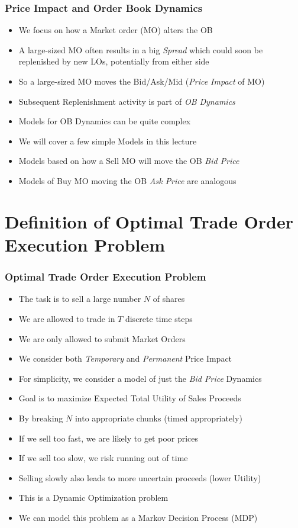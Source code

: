 \documentclass[handout]{beamer}
\begin{document}
\begin{frame}
\frametitle{Price Impact and Order Book Dynamics}
\pause
\begin{itemize}[<+->]
\item We focus on how a Market order (MO) alters the OB
\item A large-sized MO often results in a big {\em Spread} which could soon be replenished by new LOs, potentially from either side
\item So a large-sized MO moves the Bid/Ask/Mid ({\em Price Impact} of MO)
\item Subsequent Replenishment activity is part of {\em OB Dynamics}
\item Models for OB Dynamics can be quite complex
\item We will cover a few simple Models in this lecture
\item Models based on how a Sell MO will move the OB {\em Bid Price}
\item Models of Buy MO moving the OB {\em Ask Price} are analogous
\end{itemize}
\end{frame}

\section{Definition of Optimal Trade Order Execution Problem}

\begin{frame}
\frametitle{Optimal Trade Order Execution Problem}
\pause
\begin{itemize}[<+->]
\item The task is to sell a large number $N$ of shares
\item We are allowed to trade in $T$ discrete time steps
\item We are only allowed to submit Market Orders
\item We consider both {\em Temporary} and {\em Permanent} Price Impact
\item For simplicity, we consider a model of just the {\em Bid Price} Dynamics
\item Goal is to maximize Expected Total Utility of Sales Proceeds
\item By breaking $N$ into appropriate chunks (timed appropriately)
\item If we sell too fast, we are likely to get poor prices
\item If we sell too slow, we risk running out of time
\item Selling slowly also leads to more uncertain proceeds (lower Utility)
\item This is a Dynamic Optimization problem
\item We can model this problem as a Markov Decision Process (MDP)
\end{itemize}
\end{frame}
\end{document}
